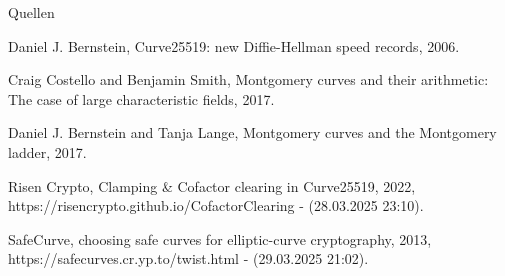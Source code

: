 \begin{frame}{Quellen}
    \begin{enumerate}[ {[}1{]} ]
        \item Daniel J. Bernstein, Curve25519: new Diffie-Hellman speed records, 2006. 
        \item Craig Costello and Benjamin Smith, Montgomery curves and their arithmetic: The case of large characteristic fields, 2017.
        \item Daniel J. Bernstein and Tanja Lange, Montgomery curves and the Montgomery ladder, 2017.
        \item Risen Crypto, Clamping \& Cofactor clearing in Curve25519, 2022, https://risencrypto.github.io/CofactorClearing - (28.03.2025 23:10).
        \item SafeCurve, choosing safe curves for elliptic-curve cryptography, 2013, https://safecurves.cr.yp.to/twist.html - (29.03.2025 21:02). 
    \end{enumerate}
\end{frame}

